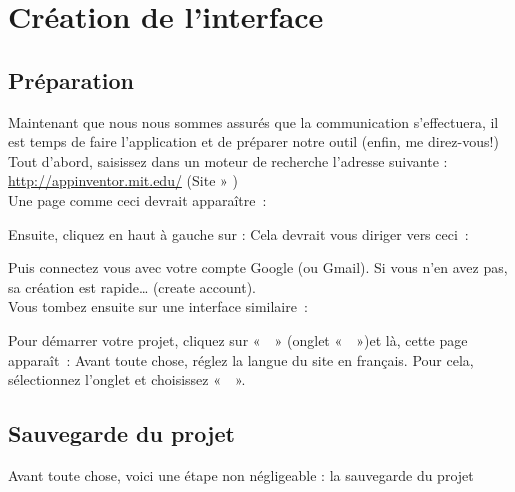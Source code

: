 \chapter{Création de l'interface}
\section{Préparation}

Maintenant que nous nous sommes assurés que la communication s'effectuera, il est temps de faire l'application et de préparer notre outil (enfin, me direz-vous!) \\

\noindent
Tout d'abord, saisissez dans un moteur de recherche l'adresse suivante : 
\url{http://appinventor.mit.edu/} (Site » ) \\

Une page comme ceci devrait apparaître :


Ensuite, cliquez en haut à gauche sur :   
Cela devrait vous diriger vers ceci : \\


Puis connectez vous avec votre compte Google (ou Gmail). Si vous n'en avez pas, sa création est rapide… (create account). \\
Vous tombez ensuite sur une interface similaire : 


\noindent
Pour démarrer votre projet, cliquez sur «  » (onglet «  »)et là, cette page apparaît : 
\noindent 
Avant toute chose, réglez la langue du site en français. Pour cela, sélectionnez l'onglet  et choisissez «  ».\\


\section{Sauvegarde du projet}

Avant toute chose, voici une étape non négligeable : la sauvegarde du projet

